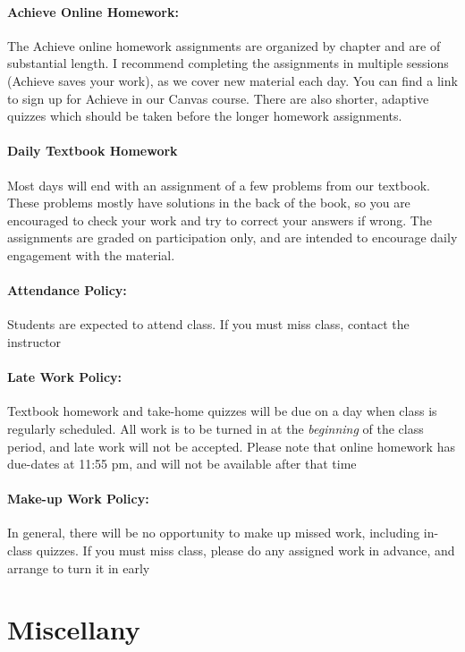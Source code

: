 \documentclass[12pt, letterpaper]{article}
\begin{document}
\paragraph{Achieve Online Homework:}
The Achieve online homework assignments are organized by chapter and are of substantial length. I recommend completing the assignments in multiple sessions (Achieve saves your work), as we cover new material each day. You can find a link to sign up for Achieve in our Canvas course. There are also shorter, adaptive quizzes which should be taken before the longer homework assignments.

\paragraph{Daily Textbook Homework}
Most days will end with an assignment of a few problems from our textbook. These problems mostly have solutions in the back of the book, so you are encouraged to check your work and try to correct your answers if wrong. The assignments are graded on participation only, and are intended to encourage daily engagement with the material.

\paragraph{Attendance Policy:}
Students are expected to attend class. If you must miss class, contact the instructor

\paragraph{Late Work Policy:}
Textbook homework and take-home quizzes will be due on a day when class is regularly scheduled. All work is to be turned in at the \emph{beginning} of the class period, and late work will not be accepted. Please note that online homework has due-dates at 11:55 pm, and will not be available after that time

\paragraph{Make-up Work Policy:}
In general, there will be no opportunity to make up missed work, including in-class quizzes. If you must miss class, please do any assigned work in advance, and arrange to turn it in early

\section*{Miscellany}
\end{document}
